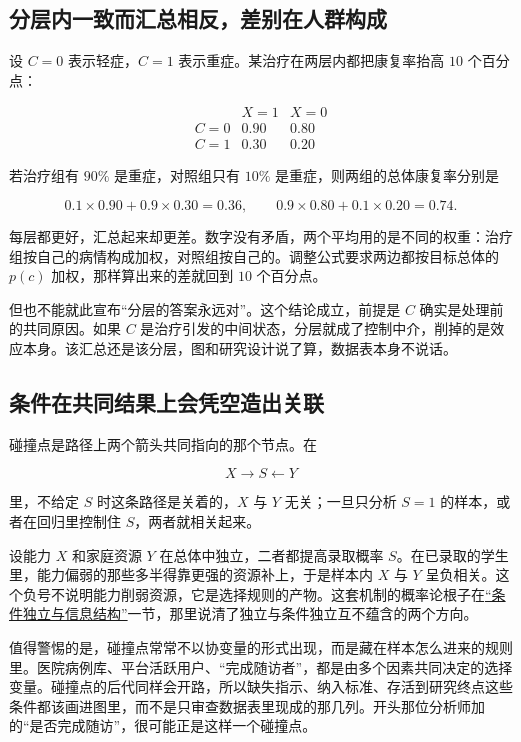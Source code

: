 \subsection{分层内一致而汇总相反，差别在人群构成}

设 \(C=0\) 表示轻症，\(C=1\) 表示重症。某治疗在两层内都把康复率抬高 \(10\) 个百分点：

\[
\begin{array}{c|cc}
& X=1 & X=0\\
\hline
C=0 & 0.90 & 0.80\\
C=1 & 0.30 & 0.20
\end{array}
\]

若治疗组有 \(90\%\) 是重症，对照组只有 \(10\%\) 是重症，则两组的总体康复率分别是

\[
0.1\times0.90+0.9\times0.30=0.36,
\qquad
0.9\times0.80+0.1\times0.20=0.74.
\]

每层都更好，汇总起来却更差。数字没有矛盾，两个平均用的是不同的权重：治疗组按自己的病情构成加权，对照组按自己的。调整公式要求两边都按目标总体的 \(p(c)\) 加权，那样算出来的差就回到 \(10\) 个百分点。

但也不能就此宣布``分层的答案永远对''。这个结论成立，前提是 \(C\) 确实是处理前的共同原因。如果 \(C\) 是治疗引发的中间状态，分层就成了控制中介，削掉的是效应本身。该汇总还是该分层，图和研究设计说了算，数据表本身不说话。

\subsection{条件在共同结果上会凭空造出关联}

碰撞点是路径上两个箭头共同指向的那个节点。在

\[
X\longrightarrow S\longleftarrow Y
\]

里，不给定 \(S\) 时这条路径是关着的，\(X\) 与 \(Y\) 无关；一旦只分析 \(S=1\) 的样本，或者在回归里控制住 \(S\)，两者就相关起来。

设能力 \(X\) 和家庭资源 \(Y\) 在总体中独立，二者都提高录取概率 \(S\)。在已录取的学生里，能力偏弱的那些多半得靠更强的资源补上，于是样本内 \(X\) 与 \(Y\) 呈负相关。这个负号不说明能力削弱资源，它是选择规则的产物。这套机制的概率论根子在\hyperref[sec:05-Probability/02-Conditional-Probability/04]{``条件独立与信息结构''}一节，那里说清了独立与条件独立互不蕴含的两个方向。

值得警惕的是，碰撞点常常不以协变量的形式出现，而是藏在样本怎么进来的规则里。医院病例库、平台活跃用户、``完成随访者''，都是由多个因素共同决定的选择变量。碰撞点的后代同样会开路，所以缺失指示、纳入标准、存活到研究终点这些条件都该画进图里，而不是只审查数据表里现成的那几列。开头那位分析师加的``是否完成随访''，很可能正是这样一个碰撞点。

